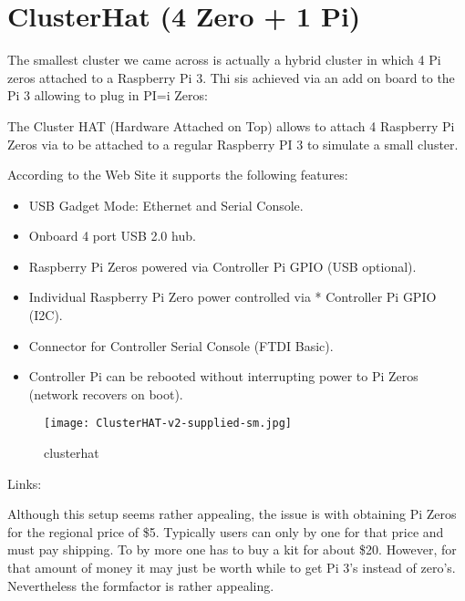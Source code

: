 

\section{ClusterHat (4 Zero + 1 Pi)}\label{clusterhat-4-zero-1-pi}

The smallest cluster we came across is actually a hybrid cluster in
which 4 Pi zeros attached to a Raspberry Pi 3. Thi sis achieved via an
add on board to the Pi 3 allowing to plug in PI=i Zeros:




The Cluster HAT (Hardware Attached on Top) allows to attach 4 Raspberry
Pi Zeros via to be attached to a regular Raspberry PI 3 to simulate a
small cluster.

According to the Web Site it supports the following features:



\begin{itemize}
\item
  USB Gadget Mode: Ethernet and Serial Console.
\item
  Onboard 4 port USB 2.0 hub.
\item
  Raspberry Pi Zeros powered via Controller Pi GPIO (USB optional).
\item
  Individual Raspberry Pi Zero power controlled via * Controller Pi GPIO
  (I2C).
\item
  Connector for Controller Serial Console (FTDI Basic).
\item
  Controller Pi can be rebooted without interrupting power to Pi Zeros
  (network recovers on boot).
\end{itemize}

\begin{figure}
\centering
\texttt{[image: ClusterHAT-v2-supplied-sm.jpg]}
\caption{clusterhat}
\end{figure}



Links:




Although this setup seems rather appealing, the issue is with obtaining
Pi Zeros for the regional price of \$5. Typically users can only by one
for that price and must pay shipping. To by more one has to buy a kit
for about \$20. However, for that amount of money it may just be worth
while to get Pi 3's instead of zero's. Nevertheless the formfactor is
rather appealing.

